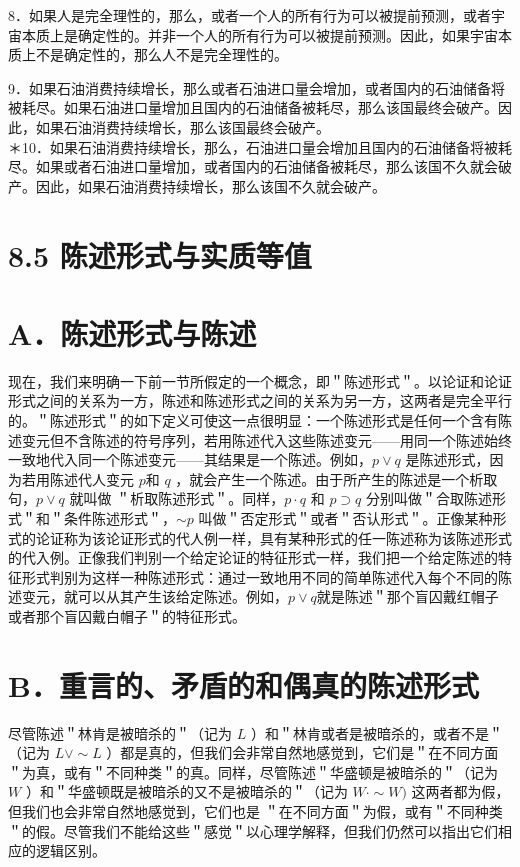 8．如果人是完全理性的，那么，或者一个人的所有行为可以被提前预测，或者宇宙本质上是确定性的。并非一个人的所有行为可以被提前预测。因此，如果宇宙本质上不是确定性的，那么人不是完全理性的。

9．如果石油消费持续增长，那么或者石油进口量会增加，或者国内的石油储备将被耗尽。如果石油进口量增加且国内的石油储备被耗尽，那么该国最终会破产。因此，如果石油消费持续增长，那么该国最终会破产。\\
＊10．如果石油消费持续增长，那么，石油进口量会增加且国内的石油储备将被耗尽。如果或者石油进口量增加，或者国内的石油储备被耗尽，那么该国不久就会破产。因此，如果石油消费持续增长，那么该国不久就会破产。

\section*{8.5 陈述形式与实质等值}
\section*{A．陈述形式与陈述}
现在，我们来明确一下前一节所假定的一个概念，即＂陈述形式＂。以论证和论证形式之间的关系为一方，陈述和陈述形式之间的关系为另一方，这两者是完全平行的。＂陈述形式＂的如下定义可使这一点很明显：一个陈述形式是任何一个含有陈述变元但不含陈述的符号序列，若用陈述代入这些陈述变元——用同一个陈述始终一致地代入同一个陈述变元——其结果是一个陈述。例如，$p \vee q$ 是陈述形式，因为若用陈述代人变元 $p$和 $q$ ，就会产生一个陈述。由于所产生的陈述是一个析取句，$p \vee q$ 就叫做 ＂析取陈述形式＂。同样，$p \cdot q$ 和 $p \supset q$ 分别叫做＂合取陈述形式＂和＂条件陈述形式＂，$\sim p$ 叫做＂否定形式＂或者＂否认形式＂。正像某种形式的论证称为该论证形式的代人例一样，具有某种形式的任一陈述称为该陈述形式的代入例。正像我们判别一个给定论证的特征形式一样，我们把一个给定陈述的特征形式判别为这样一种陈述形式：通过一致地用不同的简单陈述代入每个不同的陈述变元，就可以从其产生该给定陈述。例如，$p \vee q$就是陈述＂那个盲囚戴红帽子或者那个盲囚戴白帽子＂的特征形式。

\section*{B．重言的、矛盾的和偶真的陈述形式}
尽管陈述＂林肯是被暗杀的＂（记为 $L$ ）和＂林肯或者是被暗杀的，或者不是＂（记为 $L \vee \sim L$ ）都是真的，但我们会非常自然地感觉到，它们是＂在不同方面＂为真，或有＂不同种类＂的真。同样，尽管陈述＂华盛顿是被暗杀的＂（记为 $W$ ）和＂华盛顿既是被暗杀的又不是被暗杀的＂（记为 $W \cdot \sim W)$ 这两者都为假，但我们也会非常自然地感觉到，它们也是 ＂在不同方面＂为假，或有＂不同种类＂的假。尽管我们不能给这些＂感觉＂以心理学解释，但我们仍然可以指出它们相应的逻辑区别。

